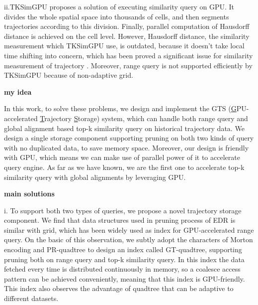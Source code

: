 \documentclass[conference]{IEEEtran}
\begin{document}
	ii.TKSimGPU\cite{DBLP:conf/bigdataconf/LealGZY15} proposes a solution of executing similarity query on GPU. It divides the whole spatial space into thousands of cells, and then segments trajectories according to this division. Finally, parallel computation of Hausdorff distance is achieved on the cell level. However, Hausdorff distance, the similarity measurement which TKSimGPU use, is outdated, because it doesn't take local time shifting into concern, which has been proved a significant issue for similarity measurement of trajectory\cite{Sayan} \cite{DBLP:conf/vldb/ChenN04} \cite{DBLP:conf/icde/YiJF98} \cite{DBLP:conf/icde/VlachosGK02}. Moreover, range query is not supported efficiently by TKSimGPU because of non-adaptive grid.
	
\textbf{my idea}
	
	In this work, to solve these problems, we design and implement the GTS (\underline{G}PU-accelerated \underline{T}rajectory \underline{S}torage) system, which can handle both range query and global alignment based top-k similarity query on historical trajectory data. We design a single storage component supporting pruning on both two kinds of query with no duplicated data, to save memory space. Moreover, our design is friendly with GPU, which means we can make use of parallel power of it to accelerate query engine. As far as we have known, we are the first one to accelerate top-k similarity query with global alignments by leveraging GPU. 
	
	

	
\textbf{main solutions}

	i. To support both two types of queries, we propose a novel trajectory storage component. We find that data structures used in pruning process of EDR is similar with grid, which has been widely used as index for GPU-accelerated range query. On the basic of this observation, we subtly adopt the characters of Morton encoding and PR-quadtree to design an index called GT-quadtree, supporting pruning both on range query and top-k similarity query. In this index the data fetched every time is distributed continuously in memory, so a coalesce access pattern can be achieved conveniently, meaning that this index is GPU-friendly. This index also observes the advantage of quadtree that can be adaptive to different datasets.
	
\end{document}

